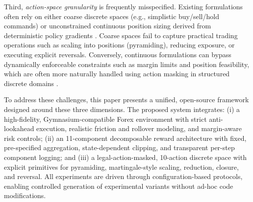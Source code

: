 Third, \emph{action-space granularity} is frequently misspecified. Existing formulations often rely on either coarse discrete spaces (e.g., simplistic buy/sell/hold commands) \citep{theate2021application} or unconstrained continuous position sizing derived from deterministic policy gradients \citep{jiang2017deep,schulman2017proximal,haarnoja2018soft}. Coarse spaces fail to capture practical trading operations such as scaling into positions (pyramiding), reducing exposure, or executing explicit reversals. Conversely, continuous formulations can bypass dynamically enforceable constraints such as margin limits and position feasibility, which are often more naturally handled using action masking in structured discrete domains \citep{huang2020closer}.

To address these challenges, this paper presents a unified, open-source framework designed around these three dimensions. The proposed system integrates: (i) a high-fidelity, Gymnasium-compatible Forex environment with strict anti-lookahead execution, realistic friction and rollover modeling, and margin-aware risk controls; (ii) an 11-component decomposable reward architecture with fixed, pre-specified aggregation, state-dependent clipping, and transparent per-step component logging; and (iii) a legal-action-masked, 10-action discrete space with explicit primitives for pyramiding, martingale-style scaling, reduction, closure, and reversal. All experiments are driven through configuration-based protocols, enabling controlled generation of experimental variants without ad-hoc code modifications.

